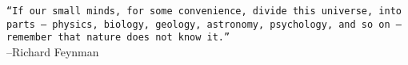 \strut 
\vfill
\begin{flushright}
\begin{minipage}[t]{.5\textwidth}\begin{flushright}
	\texttt{``If our small minds, for some convenience, divide this universe, into parts — physics, biology, geology, astronomy, psychology, and so on — remember that nature does not know it.''} \\ --Richard Feynman 
\end{flushright}\end{minipage}
\end{flushright}
\vfill 
\strut
\cleardoublepage
